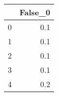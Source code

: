 \begin{tabular}{lr}
\toprule
{} &  False\_0 \\ \hline
\midrule
0 &      0.1 \\ \hline
1 &      0.1 \\ \hline
2 &      0.1 \\ \hline
3 &      0.1 \\ \hline
4 &      0.2 \\ \hline
\bottomrule
\end{tabular}
